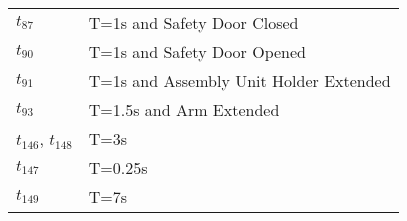 \begin{longtable}{m{5cm}m{5cm}}
\hyperlink{completeNet:tt87}{\hypertarget{completeTable:tt87}{$t_{87}$}} & T=1s and Safety Door Closed\\
\hyperlink{completeNet:tt90}{\hypertarget{completeTable:tt90}{$t_{90}$}} & T=1s and Safety Door Opened\\
\hyperlink{completeNet:tt91}{\hypertarget{completeTable:tt91}{$t_{91}$}} & T=1s and Assembly Unit Holder Extended\\
\hyperlink{completeNet:tt93}{\hypertarget{completeTable:tt93}{$t_{93}$}} & T=1.5s and Arm Extended\\
\hyperlink{completeNet:tt146}{\hypertarget{completeTable:tt146}{$t_{146}$}}, \hyperlink{completeNet:tt148}{\hypertarget{completeTable:tt148}{$t_{148}$}} & T=3s\\
\hyperlink{completeNet:tt147}{\hypertarget{completeTable:tt147}{$t_{147}$}} & T=0.25s\\
\hyperlink{completeNet:tt149}{\hypertarget{completeTable:tt149}{$t_{149}$}} & T=7s\\
\end{longtable}
